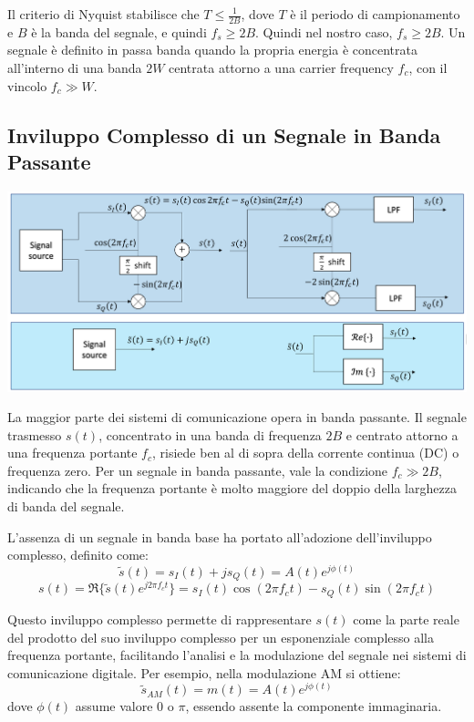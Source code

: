 Il criterio di Nyquist stabilisce che \( T \leq \frac{1}{2B} \), dove \( T \) è il periodo di campionamento e \( B \) è la banda del segnale, e quindi \( f_s \geq 2B \). Quindi nel nostro caso, $f_s \geq 2B$.
Un segnale è definito in passa banda quando la propria energia è concentrata all'interno di una banda $2W$ centrata attorno a una carrier frequency $f_c$, con il vincolo $f_c \gg W$.

\subsection*{Inviluppo Complesso di un Segnale in Banda Passante}
\begin{center}
    \includegraphics[width=1\textwidth]{imgs/complex_envelope.png}
\end{center}
La maggior parte dei sistemi di comunicazione opera in banda passante. Il segnale trasmesso \( s(t) \), concentrato in una banda di frequenza \( 2B \) e centrato attorno a una frequenza portante \( f_c \), risiede ben al di sopra della corrente continua (DC) o frequenza zero. Per un segnale in banda passante, vale la condizione \( f_c \gg 2B \), indicando che la frequenza portante è molto maggiore del doppio della larghezza di banda del segnale.

L'assenza di un segnale in banda base ha portato all'adozione dell'inviluppo complesso, definito come:
\begin{equation}
    \tilde{s}(t) = s_I(t) + js_Q(t) = A(t)e^{j\phi(t)}
\end{equation}
\begin{equation}
    s(t) = \Re\{\tilde{s}(t)e^{j2\pi f_c t}\} = s_I(t)\cos(2\pi f_c t) - s_Q(t)\sin(2\pi f_c t)
\end{equation}

Questo inviluppo complesso permette di rappresentare \( s(t) \) come la parte reale del prodotto del suo inviluppo complesso per un esponenziale complesso alla frequenza portante, facilitando l'analisi e la modulazione del segnale nei sistemi di comunicazione digitale. Per esempio, nella modulazione AM si ottiene:
\begin{equation}
    \tilde{s}_{AM}(t) = m(t) = A(t)e^{j\phi(t)}
\end{equation}
dove \( \phi(t) \) assume valore \( 0 \) o \( \pi \), essendo assente la componente immaginaria.


